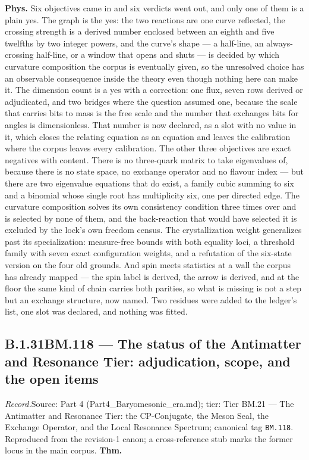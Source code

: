 \documentclass[11pt,openany]{report}
\theoremstyle{canonplain}
\theoremstyle{canondef}
\begin{document}
\textbf{Phys.} Six objectives came in and six verdicts went out, and only one of them is a plain yes. The graph is the yes: the two reactions are one curve reflected, the crossing strength is a derived number enclosed between an eighth and five twelfths by two integer powers, and the curve's shape — a half-line, an always-crossing half-line, or a window that opens and shuts — is decided by which curvature composition the corpus is eventually given, so the unresolved choice has an observable consequence inside the theory even though nothing here can make it. The dimension count is a yes with a correction: one flux, seven rows derived or adjudicated, and two bridges where the question assumed one, because the scale that carries bits to mass is the free scale and the number that exchanges bits for angles is dimensionless. That number is now declared, as a slot with no value in it, which closes the relating equation as an equation and leaves the calibration where the corpus leaves every calibration. The other three objectives are exact negatives with content. There is no three-quark matrix to take eigenvalues of, because there is no state space, no exchange operator and no flavour index — but there are two eigenvalue equations that do exist, a family cubic summing to six and a binomial whose single root has multiplicity six, one per directed edge. The curvature composition solves its own consistency condition three times over and is selected by none of them, and the back-reaction that would have selected it is excluded by the lock's own freedom census. The crystallization weight generalizes past its specialization: measure-free bounds with both equality loci, a threshold family with seven exact configuration weights, and a refutation of the six-state version on the four old grounds. And spin meets statistics at a wall the corpus has already mapped — the spin label is derived, the arrow is derived, and at the floor the same kind of chain carries both parities, so what is missing is not a step but an exchange structure, now named. Two residues were added to the ledger's list, one slot was declared, and nothing was fitted.

\medskip
\subsection*{\texorpdfstring{B.1.31\quad BM.118 — The status of the Antimatter and Resonance Tier: adjudication, scope, and the open items}{BM.118 B.1.31}}
\label{tag:BM-118}
{\small \textit{Record.}\quad Source: Part 4 (Part4\_Baryomesonic\_era.md); tier: Tier BM.21 — The Antimatter and Resonance Tier: the CP-Conjugate, the Meson Seal, the Exchange Operator, and the Local Resonance Spectrum; canonical tag \texttt{BM.118}. Reproduced from the revision-1 canon; a cross-reference stub marks the former locus in the main corpus.}
\medskip
\textbf{Thm.}
\end{document}
